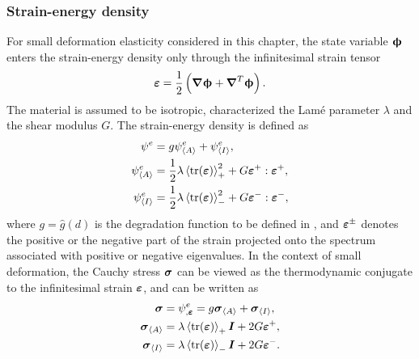\subsubsection{Strain-energy density}

For small deformation elasticity considered in this chapter, the state variable $\boldsymbol{\upphi}$ enters the strain-energy density only through the infinitesimal strain tensor
\begin{align}
  \boldsymbol{\varepsilon} = \dfrac{1}{2}\left( \boldsymbol{\nabla} \boldsymbol{\upphi} + \boldsymbol{\nabla}^T \boldsymbol{\upphi} \right).
\end{align}
The material is assumed to be isotropic, characterized the Lam\'{e} parameter $\lambda$ and the shear modulus $G$. The strain-energy density is defined as
\begin{subequations}
  \begin{align}
    \psi^e               & = g \psi^e_{\left< A \right>} + \psi^e_{\left< I \right>},                              \label{eq: chapter 3 strain-energy density} \\
    \psi^e_{\left< A \right>}   & = \dfrac{1}{2} \lambda \left<\operatorname{tr}(\boldsymbol{\varepsilon})\right>_+^2 + G \boldsymbol{\varepsilon}^+:\boldsymbol{\varepsilon}^+,                                             \\
    \psi^e_{\left< I \right>} & = \dfrac{1}{2} \lambda \left<\operatorname{tr}(\boldsymbol{\varepsilon})\right>_-^2 + G \boldsymbol{\varepsilon}^-:\boldsymbol{\varepsilon}^-,                                             
  \end{align}
\end{subequations}
where $g = \hat{g}(d)$ is the degradation function to be defined in , and $\boldsymbol{\varepsilon}^\pm$ denotes the positive or the negative part of the strain projected onto the spectrum associated with positive or negative eigenvalues. In the context of small deformation, the Cauchy stress $\boldsymbol{\sigma}$ can be viewed as the thermodynamic conjugate to the infinitesimal strain $\boldsymbol{\varepsilon}$, and can be written as
\begin{subequations}
  \begin{align}
    \boldsymbol{\sigma}               & = \psi^e_{,\boldsymbol{\varepsilon}} = g \boldsymbol{\sigma}_{\left< A \right>} + \boldsymbol{\sigma}_{\left< I \right>}, \label{eq: chapter 3 stress strain relation} \\
    \boldsymbol{\sigma}_{\left< A \right>}   & = \lambda \left<\operatorname{tr}(\boldsymbol{\varepsilon})\right>_+ \boldsymbol{I} + 2 G \boldsymbol{\varepsilon}^+,                                                         \\
    \boldsymbol{\sigma}_{\left< I \right>} & = \lambda \left<\operatorname{tr}(\boldsymbol{\varepsilon})\right>_- \boldsymbol{I} + 2 G \boldsymbol{\varepsilon}^-.                                                         
  \end{align}
\end{subequations}

